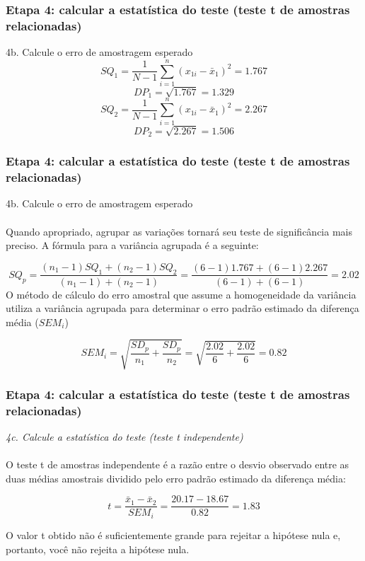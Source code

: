 \documentclass[11pt]{beamer}
\begin{document}
\begin{frame}
\frametitle{Etapa 4: calcular a estatística do teste (teste t de amostras relacionadas)}
4b. Calcule o erro de amostragem esperado
\[SQ_1 = \frac{1}{N-1}\sum_{i=1}^n(x_{1i} - \bar{x}_1)^2 = 1.767\]
\[DP_1 = \sqrt{1.767} = 1.329\]
\[SQ_2 = \frac{1}{N-1}\sum_{i=1}^n(x_{1i} - \bar{x}_1)^2 = 2.267\]
\[DP_2 = \sqrt{2.267} = 1.506\]

\end{frame}

\begin{frame}
\frametitle{Etapa 4: calcular a estatística do teste (teste t de amostras relacionadas)}
4b. Calcule o erro de amostragem esperado\\~\\
Quando apropriado, agrupar as variações tornará seu teste de significância mais preciso. A fórmula para a variância agrupada é a seguinte:

\[SQ_p = \frac{(n_1-1)SQ_1+(n_2-1)SQ_2}{(n_1-1)+(n_2-1)} = \frac{(6-1)1.767+(6-1)2.267}{(6-1)+(6-1)}=2.02\]
O método de cálculo do erro amostral que assume a homogeneidade da variância utiliza a variância agrupada para determinar o erro padrão estimado da diferença média ($SEM_i$)

\[SEM_i = \sqrt{\frac{SD_p}{n_1}+\frac{SD_p}{n_2}} = \sqrt{\frac{2.02}{6}+\frac{2.02}{6}} = 0.82\]

\end{frame}

\begin{frame}
\frametitle{Etapa 4: calcular a estatística do teste (teste t de amostras relacionadas)}

\textit{4c. Calcule a estatística do teste (teste t independente)}\\~\\

O teste t de amostras independente é a razão entre o desvio observado entre as duas médias amostrais dividido pelo erro padrão estimado da diferença média:

\[t = \frac{\bar{x}_1-\bar{x}_2}{SEM_i} =  \frac{20.17 - 18.67}{0.82} = 1.83\]

O valor t obtido não é suficientemente grande para rejeitar a hipótese nula e, portanto, você não rejeita a hipótese nula.

\end{frame}
\end{document}
